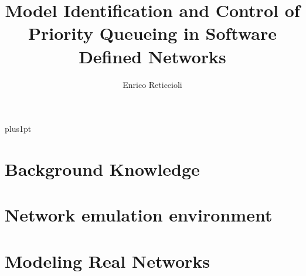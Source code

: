 \documentclass[12pt, a4paper, twoside, openright]{ociamthesis}  %
\title{Model Identification and Control of Priority Queueing in Software Defined Networks} %
\author{Enrico Reticcioli}             %
\begin{document}
\baselineskip=18pt plus1pt

\setcounter{secnumdepth}{4}
\setcounter{tocdepth}{4}

\maketitle                  %




\begin{romanpages}          %
\tableofcontents            %
\listoffigures              %
\listoftables               %
\end{romanpages}            %

%



\chapter{Background Knowledge}



\chapter{Network emulation environment}


\chapter{Modeling Real Networks}

\end{document}
